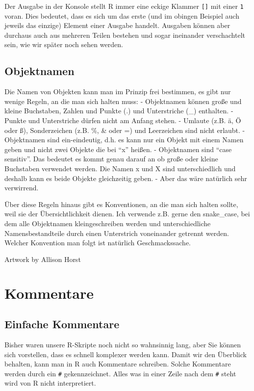 \documentclass[
]{book}
\begin{document}
Der Ausgabe in der Konsole stellt R immer eine eckige Klammer \texttt{{[}{]}} mit einer \texttt{1} voran. Dies bedeutet, dass es sich um das erste (und im obingen Beispiel auch jeweils das einzige) Element einer Ausgabe handelt. Ausgaben können aber durchaus auch aus mehreren Teilen bestehen und sogar ineinander verschachtelt sein, wie wir später noch sehen werden.

\hypertarget{objektnamen}{%
\subsection{Objektnamen}\label{objektnamen}}

Die Namen von Objekten kann man im Prinzip frei bestimmen, es gibt nur wenige Regeln, an die man sich halten muss:
- Objektnamen können große und kleine Buchstaben, Zahlen und Punkte (.) und Unterstriche (\_) enthalten.
- Punkte und Unterstriche dürfen nicht am Anfang stehen.
- Umlaute (z.B. ä, Ö oder ß), Sonderzeichen (z.B. \%, \& oder =) und Leerzeichen sind nicht erlaubt.
- Objektnamen sind ein-eindeutig, d.h. es kann nur ein Objekt mit einem Namen geben und nicht zwei Objekte die bei ``x'' heißen.
- Objektnamen sind ``case sensitiv''. Das bedeutet es kommt genau darauf an ob große oder kleine Buchstaben verwendet werden. Die Namen x und X sind unterschiedlich und deshalb kann es beide Objekte gleichzeitig geben. - Aber das wäre natürlich sehr verwirrend.

Über diese Regeln hinaus gibt es Konventionen, an die man sich halten sollte, weil sie der Übersichtlichkeit dienen. Ich verwende z.B. gerne den snake\_case, bei dem alle Objektnamen kleingeschreiben werden und unterschiedliche Namensbestandteile durch einen Unterstrich voneinander getrennt werden. Welcher Konvention man folgt ist natürlich Geschmackssache.

Artwork by Allison Horst

\hypertarget{kommentare}{%
\section{Kommentare}\label{kommentare}}

\hypertarget{einfache-kommentare}{%
\subsection{Einfache Kommentare}\label{einfache-kommentare}}

Bisher waren unsere R-Skripte noch nicht so wahnsinnig lang, aber Sie können sich vorstellen, dass es schnell komplexer werden kann. Damit wir den Überblick behalten, kann man in R auch Kommentare schreiben. Solche Kommentare werden durch ein \texttt{\#} gekennzeichnet. Alles was in einer Zeile nach dem \texttt{\#} steht wird von R nicht interpretiert.
\end{document}
